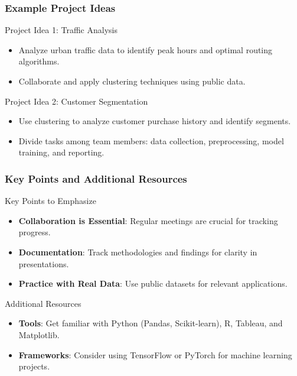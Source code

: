 \documentclass[aspectratio=169]{beamer}
\begin{document}
\begin{frame}[fragile]
    \frametitle{Example Project Ideas}
    \begin{block}{Project Idea 1: Traffic Analysis}
        \begin{itemize}
            \item Analyze urban traffic data to identify peak hours and optimal routing algorithms.
            \item Collaborate and apply clustering techniques using public data.
        \end{itemize}
    \end{block}

    \begin{block}{Project Idea 2: Customer Segmentation}
        \begin{itemize}
            \item Use clustering to analyze customer purchase history and identify segments.
            \item Divide tasks among team members: data collection, preprocessing, model training, and reporting.
        \end{itemize}
    \end{block}
\end{frame}

\begin{frame}[fragile]
    \frametitle{Key Points and Additional Resources}
    \begin{block}{Key Points to Emphasize}
        \begin{itemize}
            \item \textbf{Collaboration is Essential}: Regular meetings are crucial for tracking progress.
            \item \textbf{Documentation}: Track methodologies and findings for clarity in presentations.
            \item \textbf{Practice with Real Data}: Use public datasets for relevant applications.
        \end{itemize}
    \end{block}

    \begin{block}{Additional Resources}
        \begin{itemize}
            \item \textbf{Tools}: Get familiar with Python (Pandas, Scikit-learn), R, Tableau, and Matplotlib.
            \item \textbf{Frameworks}: Consider using TensorFlow or PyTorch for machine learning projects.
        \end{itemize}
    \end{block}
\end{frame}
\end{document}
